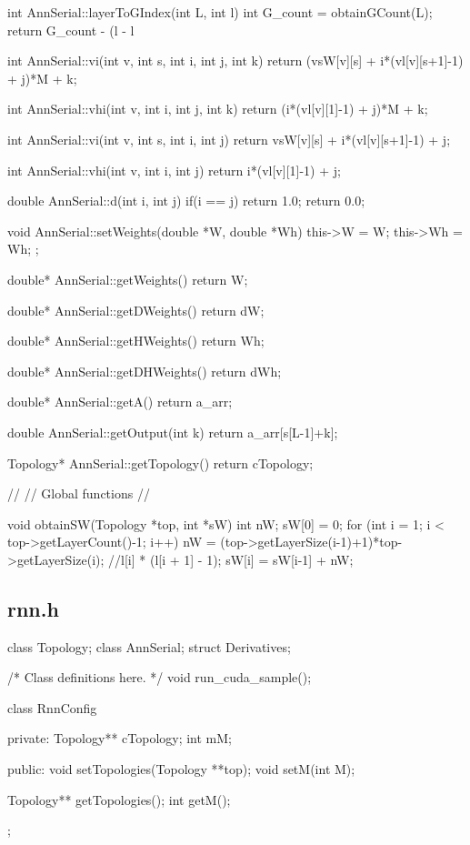 int AnnSerial::layerToGIndex(int L, int l){
  int G\_count = obtainGCount(L);
  return G\_count - (l - l%
}

int AnnSerial::vi(int v, int s, int i, int j, int k){
  return (vsW[v][s] + i*(vl[v][s+1]-1) + j)*M + k;
}

int AnnSerial::vhi(int v, int i, int j, int k){
  return  (i*(vl[v][1]-1) + j)*M + k;
}

int AnnSerial::vi(int v, int s, int i, int j){
  return vsW[v][s] + i*(vl[v][s+1]-1) + j;
}

int AnnSerial::vhi(int v, int i, int j){
  return  i*(vl[v][1]-1) + j;
}

double AnnSerial::d(int i, int j){
  if(i == j) return 1.0;
  return 0.0;
}

void AnnSerial::setWeights(double *W, double *Wh){
  this->W = W;
  this->Wh = Wh;
};

double* AnnSerial::getWeights(){
	return W;
}

double* AnnSerial::getDWeights(){
	return dW;
}

double* AnnSerial::getHWeights(){
	return Wh;
}

double* AnnSerial::getDHWeights(){
	return dWh;
}

double* AnnSerial::getA(){
	return a\_arr;
}

double AnnSerial::getOutput(int k){
  return a\_arr[s[L-1]+k];
}


Topology* AnnSerial::getTopology(){
  return cTopology;
}

//
// Global functions
//


void obtainSW(Topology *top, int *sW){
  int nW;
  sW[0] = 0;
  for (int i = 1; i < top->getLayerCount()-1; i++) {
		nW = (top->getLayerSize(i-1)+1)*top->getLayerSize(i); //l[i] * (l[i + 1] - 1);
    sW[i] = sW[i-1] + nW;
  }
}

\subsection{rnn.h}

class Topology;
class AnnSerial;
struct Derivatives;

/* Class definitions here. */
void run\_cuda\_sample();

class RnnConfig{
private:
  Topology** cTopology;
  int mM;


public:
  void setTopologies(Topology **top);
  void setM(int M);


  Topology** getTopologies();
  int getM();

};



